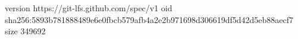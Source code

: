 version https://git-lfs.github.com/spec/v1
oid sha256:5893b781888489e6e0fbcb579afb4a2e2b971698d306619df5d42d5eb88aecf7
size 349692
